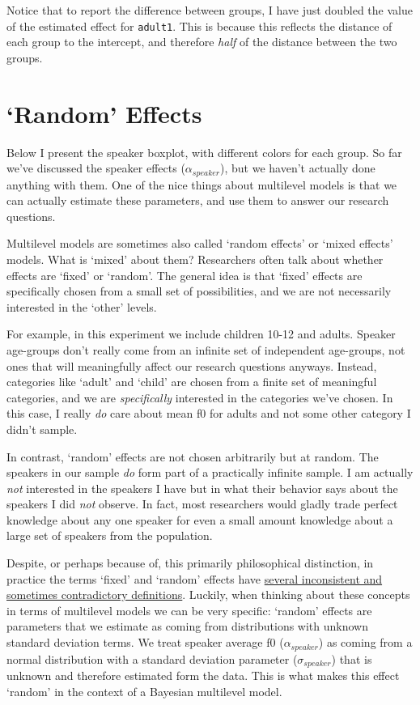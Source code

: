 \documentclass[
]{book}
\begin{document}
Notice that to report the difference between groups, I have just doubled the value of the estimated effect for \texttt{adult1}. This is because this reflects the distance of each group to the intercept, and therefore \emph{half} of the distance between the two groups.

\hypertarget{random-effects}{%
\section{`Random' Effects}\label{random-effects}}

Below I present the speaker boxplot, with different colors for each group. So far we've discussed the speaker effects (\(\alpha_{speaker}\)), but we haven't actually done anything with them. One of the nice things about multilevel models is that we can actually estimate these parameters, and use them to answer our research questions.

Multilevel models are sometimes also called `random effects' or `mixed effects' models. What is `mixed' about them? Researchers often talk about whether effects are `fixed' or `random'. The general idea is that `fixed' effects are specifically chosen from a small set of possibilities, and we are not necessarily interested in the `other' levels.

For example, in this experiment we include children 10-12 and adults. Speaker age-groups don't really come from an infinite set of independent age-groups, not ones that will meaningfully affect our research questions anyways. Instead, categories like `adult' and `child' are chosen from a finite set of meaningful categories, and we are \emph{specifically} interested in the categories we've chosen. In this case, I really \emph{do} care about mean f0 for adults and not some other category I didn't sample.

In contrast, `random' effects are not chosen arbitrarily but at random. The speakers in our sample \emph{do} form part of a practically infinite sample. I am actually \emph{not} interested in the speakers I have but in what their behavior says about the speakers I did \emph{not} observe. In fact, most researchers would gladly trade perfect knowledge about any one speaker for even a small amount knowledge about a large set of speakers from the population.

Despite, or perhaps because of, this primarily philosophical distinction, in practice the terms `fixed' and `random' effects have \href{https://statmodeling.stat.columbia.edu/2005/01/25/why_i_dont_use/}{several inconsistent and sometimes contradictory definitions}.
Luckily, when thinking about these concepts in terms of multilevel models we can be very specific: `random' effects are parameters that we estimate as coming from distributions with unknown standard deviation terms. We treat speaker average f0 (\(\alpha_{speaker}\)) as coming from a normal distribution with a standard deviation parameter (\(\sigma_{speaker}\)) that is unknown and therefore estimated form the data. This is what makes this effect `random' in the context of a Bayesian multilevel model.
\end{document}
